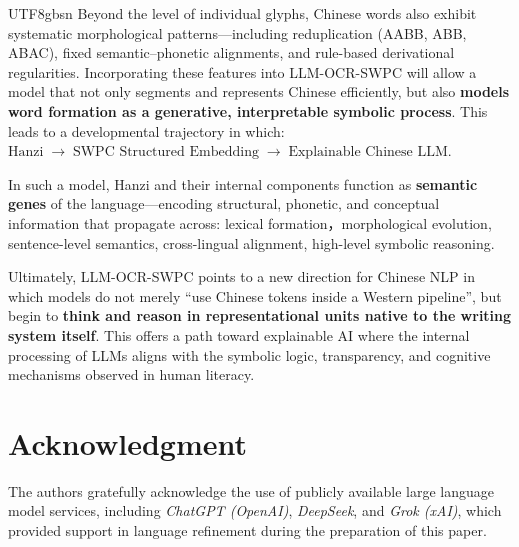\documentclass[conference]{IEEEtran}
\begin{document}
\begin{CJK*}{UTF8}{gbsn}
Beyond the level of individual glyphs, Chinese words also exhibit systematic morphological patterns---including reduplication (AABB, ABB, ABAC), fixed semantic–phonetic alignments, and rule-based derivational regularities. Incorporating these features into LLM-OCR-SWPC will allow a model that not only segments and represents Chinese efficiently, but also \textbf{models word formation as a generative, interpretable symbolic process}. This leads to a developmental trajectory in which: \textit{$\text{Hanzi} \;\rightarrow\; \text{SWPC Structured Embedding} \;\rightarrow\; \text{Explainable Chinese LLM}$}.

In such a model, Hanzi and their internal components function as \textbf{semantic genes} of the language---encoding structural, phonetic, and conceptual information that propagate across: lexical formation，morphological evolution, sentence-level semantics, cross-lingual alignment, high-level symbolic reasoning.

Ultimately, LLM-OCR-SWPC points to a new direction for Chinese NLP in which models do not merely ``use Chinese tokens inside a Western pipeline'', but begin to \textbf{think and reason in representational units native to the writing system itself}. This offers a path toward explainable AI where the internal processing of LLMs aligns with the symbolic logic, transparency, and cognitive mechanisms observed in human literacy.


\section*{Acknowledgment}

The authors gratefully acknowledge the use of publicly available large language model services, including \textit{ChatGPT (OpenAI)}, \textit{DeepSeek}, and \textit{Grok (xAI)}, which provided support in language refinement during the preparation of this paper.





\end{CJK*}
\end{document}
